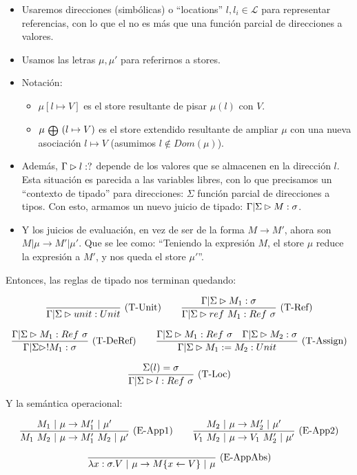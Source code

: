 \begin{itemize}
  \item Usaremos direcciones (simbólicas) o ``locations'' $l, l_i \in \mathcal{L}$ para representar referencias, con lo que el  no es más que una función parcial de direcciones a valores.
  \item Usamos las letras $\mu, \mu'$ para referirnos a stores.
  \item Notación:
    \begin{itemize}
      \item $\mu[l \mapsto V]$ es el store resultante de pisar $\mu(l)$ con $V$.
      \item $\mu\ {\scriptstyle \medoplus}\ (l \mapsto V)$ es el store extendido resultante de ampliar $\mu$ con una nueva asociación $l \mapsto V$ (asumimos $l \notin Dom(\mu)$).
    \end{itemize}
  \item Además, $\Gamma \rhd l : ?$ depende de los valores que se almacenen en la dirección $l$. Esta situación es parecida a las variables libres, con lo que precisamos un ``contexto de tipado'' para direcciones: $\Sigma$ función parcial de direcciones a tipos. Con esto, armamos un nuevo juicio de tipado: $\Gamma|\Sigma \rhd M : \sigma$.
  \item Y los juicios de evaluación, en vez de ser de la forma $M \to M'$, ahora son  $M \vert \mu \to M' \vert \mu'$. Que se lee como: ``Teniendo la expresión $M$, el store $\mu$ reduce la expresión a $M'$, y nos queda el store $\mu'$''.
\end{itemize}

Entonces, las reglas de tipado nos terminan quedando:

\[\deriv{}{\GStipa{unit}{Unit}}{T-Unit}\quad\quad \deriv{\GStipa{M_1}{\sigma}}{\GStipa{ref\ M_1}{Ref\ \sigma}}{T-Ref}\]

\[\deriv{\GStipa{M_1}{Ref\ \sigma}}{\GStipa{!M_1}{\sigma}}{T-DeRef}\quad\quad \deriv{\GStipa{M_1}{Ref\ \sigma}\quad \GStipa{M_2}{\sigma}}{\GStipa{M_1 := M_2}{Unit}}{T-Assign}\]

\[\frac{\Sigma(l) = \sigma}{\Gamma|\Sigma \rhd l : Ref\ \sigma}\ \text{(T-Loc)}\]

Y la semántica operacional:

\[\frac{M_1 \ |\  \mu \to M_1' \ |\  \mu'}{M_1\ M_2 \ |\  \mu \to M_1'\ M_2 \ |\  \mu'}\ \text{(E-App1)}\quad\quad \frac{M_2 \ |\  \mu \to M_2' \ |\  \mu'}{V_1\ M_2 \ |\  \mu \to V_1\ M_2' \ |\  \mu'}\ \text{(E-App2)}\]

\[\frac{}{\lambda x:\sigma.V \ |\  \mu \to M\{x \leftarrow V\} \ |\  \mu}\ \text{(E-AppAbs)}\]

